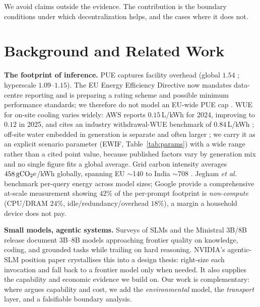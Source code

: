 \documentclass[conference]{IEEEtran}
\newcommand{\gco}{\,\text{gCO\textsubscript{2}e}}
\begin{document}
We avoid claims outside the evidence. The contribution is the boundary conditions
under which decentralization helps, and the cases where it does not.

\section{Background and Related Work}
\textbf{The footprint of inference.}
PUE captures facility overhead (global $1.54$ \cite{uptime2025}; hyperscale
$1.09$--$1.15$). The EU Energy Efficiency Directive now mandates data-centre
reporting and is preparing a rating scheme and possible minimum performance
standards; we therefore do not model an EU-wide PUE cap \cite{eu_eed2026}. WUE
for on-site cooling varies widely: AWS reports $0.15$\,L/kWh for 2024, improving
to $0.12$ in 2025, and cites
an industry withdrawal-WUE benchmark of $0.84$\,L/kWh
\cite{aws_water2025,devriesgao2025}; off-site water embedded in generation is
separate and often larger \cite{ucriverside2023}; we carry it as an explicit
scenario parameter (EWIF, Table~\ref{tab:params}) with a wide range rather than a
cited point value, because published factors vary by generation mix and no
single figure fits a global average. Grid carbon intensity averages
$458\gco$/kWh
globally, spanning EU $\sim$140 to India $\sim$708 \cite{ember2026}. Jegham
\emph{et al.}\ \cite{jegham2025} benchmark per-query energy across model sizes;
Google \cite{elsworth2025} provide a comprehensive at-scale measurement showing
$42\%$ of the per-prompt footprint is \emph{non-compute} (CPU/DRAM $24\%$,
idle/redundancy/overhead $18\%$), a margin a household device does not pay.

\textbf{Small models, agentic systems.}
Surveys of SLMs \cite{wang2024slm} and the Ministral 3B/8B release
\cite{mistral2024} document 3B--8B models approaching frontier quality on
knowledge, coding, and grounded tasks while trailing on hard reasoning. NVIDIA's
agentic-SLM position paper \cite{belcak2025} crystallises this into a design
thesis: right-size each invocation and fall back to a frontier model only when
needed. It also supplies the capability and economic evidence we build on. Our work
is complementary: where \cite{belcak2025} argues capability and cost, we add the
\emph{environmental} model, the \emph{transport} layer, and a falsifiable
boundary analysis.
\end{document}
